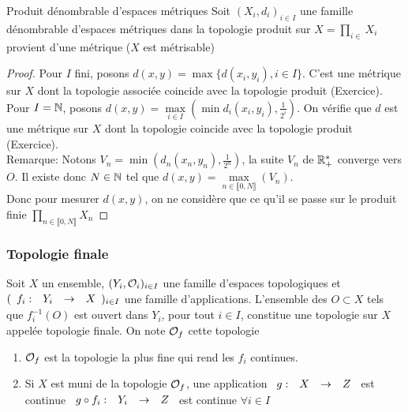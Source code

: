 \documentclass[]{report}
\begin{document}
    \begin{prop}{Produit dénombrable d'espaces métriques}{}
        Soit $(X_i,d_i)_{i\in I}$ une famille dénombrable d'espaces métriques dans la topologie produit sur $X=\prod_{i\in}X_i$ provient d'une métrique ($X$ est métrisable)
    \end{prop}

    \begin{proof}
        Pour $I$ fini, posons $d(x,y)=\max\{d(x_i,y_i),i\in I\}$. C'est une métrique sur $X$ dont la topologie associée coincide avec la topologie produit (Exercice).\\
        Pour $I=\mathbb{N}$, posons $d(x,y)=\underset{i\in I}{\max}(\min d_i(x_i,y_i),\frac{1}{2^i})$. On vérifie que $d$ est une métrique sur $X$ dont la topologie coincide avec la topologie produit (Exercice).\\
        Remarque: Notons $V_n=\min(d_n(x_n,y_n),\frac{1}{2^n})$, la suite $V_n$ de $\mathbb{R}_+^*$ converge vers $O$. Il existe donc $N\in\mathbb{N}$ tel que $d(x,y)=\underset{n\in\llbracket 0,N\rrbracket}{\max}(V_n)$.\\
        Donc pour mesurer $d(x,y)$, on ne considère que ce qu'il se passe sur le produit finie $\prod_{n\in\llbracket 0,N\rrbracket}X_n$
    \end{proof}

    \subsubsection*{Topologie finale}

    \begin{df}{}{}
        Soit $X$ un ensemble, $(Y_i,\mathcal{O}_i)_{i\in I}$ une famille d'espaces topologiques et $(\begin{array}{ccccc} f_i : & Y_i & \to & X \end{array})_{i\in I}$ une famille d'applications. L'ensemble des $O\subset X$ tels que $f_i^{-1}(O)$ est ouvert dans $Y_i$, pour tout $i\in I$, constitue une topologie sur $X$ appelée topologie finale. On note $\mathcal{O}_f$ cette topologie
    \end{df}

    \begin{prop}{}{}
        \begin{enumerate}
            \item $\mathcal{O}_f$ est la topologie la plus fine qui rend les $f_i$ continues.
            \item Si $X$ est muni de la topologie $\mathcal{O}_f$, une application $\begin{array}{ccccc} g : & X & \to & Z \end{array}$ est continue \ssi $\begin{array}{ccccc} g\circ f_i : & Y_i & \to & Z \end{array}$ est continue $\forall i\in I$ 
        \end{enumerate}
    \end{prop}
\end{document}
